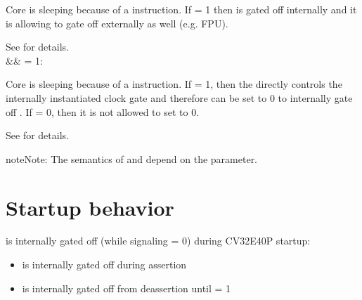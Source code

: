 \documentclass[letterpaper,10pt,english]{sphinxmanual}
\begin{document}
\begin{savenotes}
\begin{tabular}[t]{}
\sphinxAtStartPar
Core is sleeping because of a  instruction.
If  = 1 then  is gated
off internally and it is allowing to gate off
 externally as well (e.g. FPU).

\sphinxAtStartPar
See {\hyperref[\detokenize{sleep:wfi}]{}} for details.
\\
&&
\sphinxAtStartPar
{} = 1:

\sphinxAtStartPar
Core is sleeping because
of a  instruction.
If  = 1,
then the  directly
controls the internally instantiated clock gate
and therefore  can be set
to 0 to internally gate off . If
 = 0, then it is not allowed
to set  to 0.

\sphinxAtStartPar
See {\hyperref[\detokenize{sleep:pulp-cluster}]{}} for details.
\\
\sphinxbottomrule
\end{tabular}
\sphinxtableafterendhook\par
\sphinxattableend\end{savenotes}

\begin{sphinxadmonition}{note}{Note:}
\sphinxAtStartPar
The semantics of  and  depend on the  parameter.
\end{sphinxadmonition}


\section{Startup behavior}
\label{\detokenize{sleep:startup-behavior}}
\sphinxAtStartPar
{} is internally gated off (while signaling  = 0) during CV32E40P startup:
\begin{itemize}
\item {} 
\sphinxAtStartPar
{} is internally gated off during  assertion

\item {} 
\sphinxAtStartPar
{} is internally gated off from  deassertion until  = 1

\end{itemize}
\end{document}
